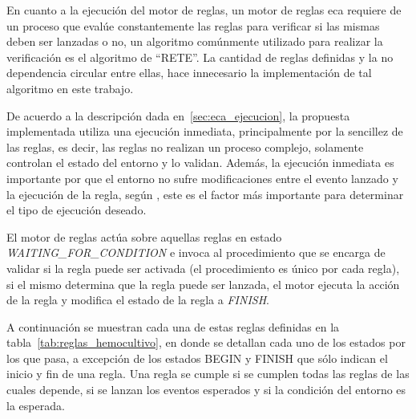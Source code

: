 
En cuanto a la ejecución del motor de reglas, un motor de reglas \gls{eca} requiere de 
un proceso que evalúe constantemente
las reglas para verificar si las mismas deben ser lanzadas o
no\cite{bailey2004event,galton2002two}, un algoritmo comúnmente utilizado para
realizar la verificación es el algoritmo de \enquote{RETE}\cite{de2001eca}. La cantidad de
reglas definidas y la no dependencia circular entre ellas, hace innecesario la
implementación de tal algoritmo en este trabajo\cite{de2001eca}. 

De acuerdo a la descripción dada en~\ref{sec:eca_ejecucion}, la propuesta
implementada utiliza una ejecución inmediata, principalmente por la sencillez
de las reglas, es decir, las reglas no realizan un proceso complejo, solamente
controlan el estado del entorno y lo validan. Además, la ejecución inmediata es 
importante por que el entorno no sufre
modificaciones entre el evento lanzado y la ejecución de la regla, según
\cite{bailey2004event}, este es el factor más importante para determinar el tipo
de ejecución deseado.

El motor de reglas actúa sobre aquellas reglas en estado
\emph{WAITING\_FOR\_CONDITION} e invoca al procedimiento que se encarga de
validar si la regla puede ser activada (el procedimiento es único por cada
regla), si el mismo determina que la regla puede ser lanzada, el motor ejecuta
la acción de la regla y modifica el estado de la regla a \emph{FINISH}.


A continuación se muestran cada una de estas reglas definidas en la
tabla~\ref{tab:reglas_hemocultivo}, en donde se detallan cada uno de los estados
por los que pasa, a excepción de los estados BEGIN y FINISH que sólo indican el
inicio y fin de una regla. Una regla se cumple si se cumplen todas las reglas de
las cuales depende, si se lanzan los eventos esperados y si la condición del
entorno es la esperada.


